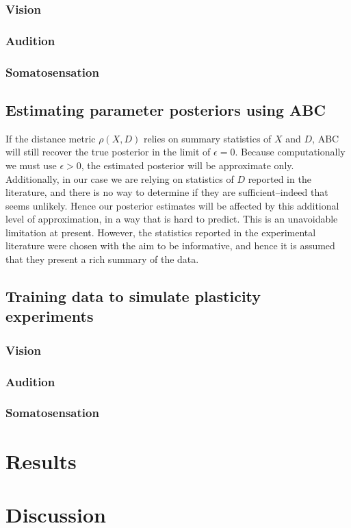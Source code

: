 \documentclass[10pt,letterpaper]{article}
\begin{document}
\subsubsection{Vision}
\subsubsection{Audition}
\subsubsection{Somatosensation}

\subsection{Estimating parameter posteriors using ABC}

If the distance metric $\rho(X,D)$ relies on summary statistics of $X$ and $D$, ABC will still recover the true posterior in the limit of $\epsilon=0$. Because computationally we must use $\epsilon > 0$, the estimated posterior will be approximate only. Additionally, in our case we are relying on statistics of $D$ reported in the literature, and there is no way to determine if they are sufficient--indeed that seems unlikely. Hence our posterior estimates will be affected by this additional level of approximation, in a way that is hard to predict. This is an unavoidable limitation at present. However, the statistics reported in the experimental literature were chosen with the aim to be informative, and hence it is assumed that they present a rich summary of the data.

\subsection{Training data to simulate plasticity experiments}
\subsubsection{Vision}
\subsubsection{Audition}
\subsubsection{Somatosensation}
\section{Results}

\section{Discussion}
\end{document}
